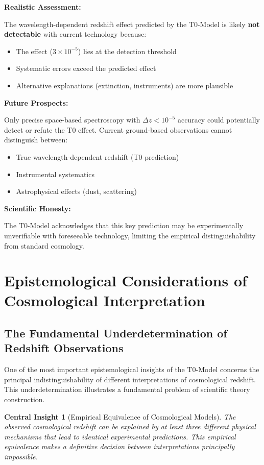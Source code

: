 \documentclass[12pt,a4paper]{report}
\newtheorem{insight}{Central Insight}[chapter]
\begin{document}
\textbf{Realistic Assessment:}

The wavelength-dependent redshift effect predicted by the T0-Model is likely \textbf{not detectable} with current technology because:
\begin{itemize}
	\item The effect ($3 \times 10^{-5}$) lies at the detection threshold
	\item Systematic errors exceed the predicted effect
	\item Alternative explanations (extinction, instruments) are more plausible
\end{itemize}

\textbf{Future Prospects:}

Only precise space-based spectroscopy with $\Delta z < 10^{-5}$ accuracy could potentially detect or refute the T0 effect. Current ground-based observations cannot distinguish between:
\begin{itemize}
	\item True wavelength-dependent redshift (T0 prediction)
	\item Instrumental systematics
	\item Astrophysical effects (dust, scattering)
\end{itemize}

\textbf{Scientific Honesty:}

The T0-Model acknowledges that this key prediction may be experimentally unverifiable with foreseeable technology, limiting the empirical distinguishability from standard cosmology.
	
	\section{Epistemological Considerations of Cosmological Interpretation}\label{sec:epistemological_considerations}
	
	\subsection{The Fundamental Underdetermination of Redshift Observations}\label{subsec:underdetermination_redshift}
	
	One of the most important epistemological insights of the T0-Model concerns the principal indistinguishability of different interpretations of cosmological redshift. This underdetermination illustrates a fundamental problem of scientific theory construction.
	
	\begin{insight}[Empirical Equivalence of Cosmological Models]
		The observed cosmological redshift can be explained by at least three different physical mechanisms that lead to identical experimental predictions. This empirical equivalence makes a definitive decision between interpretations principally impossible.
	\end{insight}
	
\end{document}

